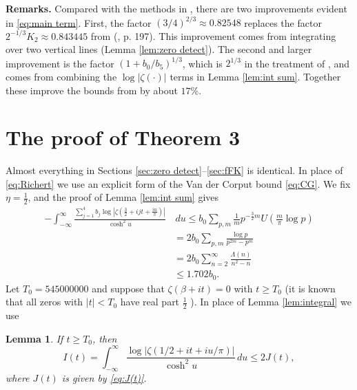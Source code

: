 \documentclass[10pt]{amsart}
\theoremstyle{remark}
\theoremstyle{plain}
\newtheorem{lemma}{Lemma}[section]
\numberwithin{equation}{section}
\theoremstyle{definition}
\def\({\left(}
\def\){\right)}
\newcommand{\be}{\begin{equation}}
\begin{document}
{\bf Remarks.}
Compared with the methods in \cite{HB1}, there are two improvements
evident in \eqref{eq:main term}.
First, the factor $(3/4)^{2/3} \approx 0.82548$ 
replaces the factor $2^{-1/3}K_2 \approx 0.843445$ from
 (\cite{HB1}, p. 197).  This improvement
comes from integrating over two vertical lines (Lemma \ref{lem:zero detect}).
The second
and larger improvement is the factor $(1+b_0/b_5)^{1/3}$, which is
$2^{1/3}$ in the treatment of \cite{HB1}, and comes from  combining the
$\log |\zeta(\cdot)|$ terms in Lemma \ref{lem:int sum}.
  Together these improve the
bounds from \cite{HB1} by about $17\%$.
\bigskip

%
%
\section{The proof of Theorem 3}
%
%
%

Almost everything in Sections \ref{sec:zero detect}--\ref{sec:fFK} is
identical.  
In place of \eqref{eq:Richert} we use
an explicit form of the Van der Corput bound \eqref{eq:CG}.
We fix $\eta=\frac12$, and the proof of Lemma \ref{lem:int sum}
gives
\be
\begin{split}
-\int_{-\infty}^\infty \frac{\sum_{j=1}^4 b_j 
\log |\zeta\(\tfrac32+ijt+\tfrac{iu}{\pi} \)|}{\cosh^2 u}& \, du \le
b_0 \sum_{p,m} \tfrac1{m} p^{-\frac32 m} U(\tfrac{m}{\pi} \log p) \\
&= 2b_0 \sum_{p,m} \frac{\log p}{p^{2m}-p^{m}} \\
&= 2b_0 \sum_{n=2}^\infty \frac{\Lambda(n)}{n^2-n} \\
&\le 1.702b_0.
\end{split}\label{eq:int num spec}
\end{equation}
Let $T_0=545000000$ and suppose that $\zeta(\beta+it)=0$ with $t\ge T_0$
(it is known that all zeros with $|t|<T_0$ have real part $\frac12$
\cite{LRW}).
In place of Lemma \ref{lem:integral} we use

\begin{lemma} \label{lem:clas int}
If $t\ge T_0$, then
$$
I(t) = \int_{-\infty}^{\infty} \frac{\log | \zeta(1/2+it+iu/\pi)|}{\cosh^2 u}
\, du \le 2 J(t),
$$
where $J(t)$ is given by \eqref{eq:J(t)}.
\end{lemma}
\end{document}
